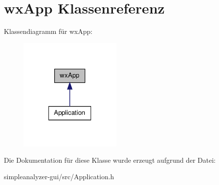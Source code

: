 \hypertarget{classwxApp}{\section{wx\-App Klassenreferenz}
\label{classwxApp}
}


Klassendiagramm für wx\-App\-:
\nopagebreak
\begin{figure}[H]
\begin{center}
\leavevmode
\includegraphics[width=144pt]{classwxApp__inherit__graph}
\end{center}
\end{figure}


Die Dokumentation für diese Klasse wurde erzeugt aufgrund der Datei\-:\begin{DoxyCompactItemize}
\item 
simpleanalyzer-\/gui/src/Application.\-h\end{DoxyCompactItemize}
